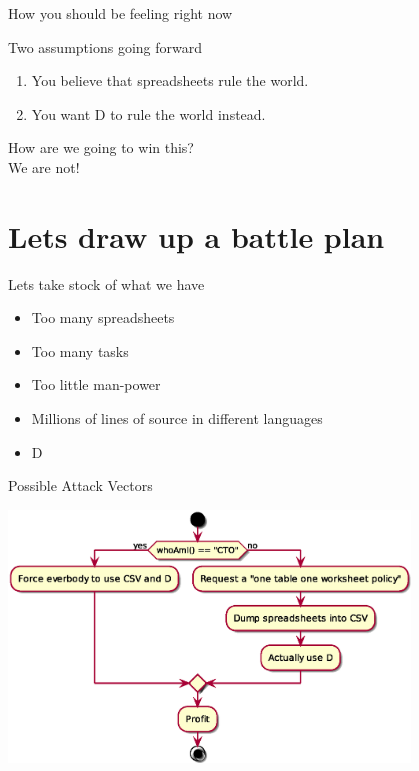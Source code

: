 \documentclass[aspectratio=169]{beamer}
\begin{document}
	\begin{frame}{How you should be feeling right now}
		\begin{center}
		\end{center}
	\end{frame}

	\begin{frame}{Two assumptions going forward}
		\huge
		\begin{enumerate}
			\item You believe that spreadsheets rule the world.
			\item You want D to rule the world instead.
		\end{enumerate}
	\end{frame}

	\begin{frame}{\mbox{}}
		\begin{center}
			\huge
			How are we going to win this?\\[2cm]
			\pause
			We are not!
		\end{center}
	\end{frame}

	\section{Lets draw up a battle plan}

	\begin{frame}{Lets take stock of what we have}
		\large
		\begin{itemize}
			\item Too many spreadsheets
			\item Too many tasks
			\item Too little man-power\\[1cm] \pause
			\item Millions of lines of source in different languages
			\item D
		\end{itemize}
	\end{frame}

	\begin{frame}{Possible Attack Vectors}
		\begin{center}
		\includegraphics[width=0.8\textwidth]{attackvectors.eps}
		\end{center}
	\end{frame}
\end{document}
